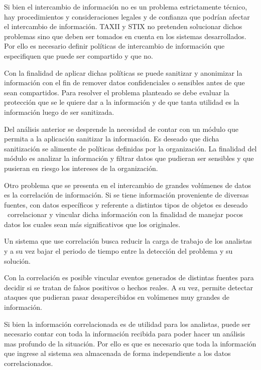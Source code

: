 \documentclass[11pt]{article}
\begin{document}
\bigskip

Si bien el intercambio de información no es un problema estrictamente técnico, hay procedimientos y consideraciones
legales y de confianza que podrían afectar el intercambio de información. TAXII y STIX no pretenden solucionar dichos
problemas sino que deben ser tomados en cuenta en los sistemas desarrollados. Por ello es necesario definir políticas
de intercambio de información que especifiquen que puede ser compartido y que no.

Con la finalidad de aplicar dichas políticas se puede sanitizar y anonimizar la información con el fin de remover datos
confidenciales o sensibles antes de que sean compartidos. Para resolver el problema planteado se debe evaluar la
protección que se le quiere dar a la información y de que tanta utilidad es la información luego de ser sanitizada.

Del análisis anterior se desprende la necesidad de contar con un módulo que permita a la aplicación sanitizar la
información. Es deseado que dicha sanitización se alimente de políticas definidas por la organización. La finalidad del
módulo es analizar la información y filtrar datos que pudieran ser sensibles y que pusieran en riesgo los intereses de
la organización.


\bigskip

Otro problema que se presenta en el intercambio de grandes volúmenes de datos es la correlación de información. Si se
tiene información proveniente de diversas fuentes, con datos específicos y referente a distintos tipos de objetos es
deseado \ correlacionar y vincular dicha información con la finalidad de manejar pocos datos los cuales sean más
significativos que los originales.

Un sistema que use correlación busca reducir la carga de trabajo de los analistas y a su vez bajar el periodo de tiempo
entre la detección del problema y su solución.

Con la correlación es posible vincular eventos generados de distintas fuentes para decidir si se tratan de falsos
positivos o hechos reales. A su vez, permite detectar ataques que pudieran pasar desapercibidos en volúmenes muy
grandes de información.


\bigskip

Si bien la información correlacionada es de utilidad para los analistas, puede ser necesario contar con toda la
información recibida para poder hacer un análisis mas profundo de la situación. Por ello es que es necesario que toda
la información que ingrese al sistema sea almacenada de forma independiente a los datos correlacionados. 
\end{document}
